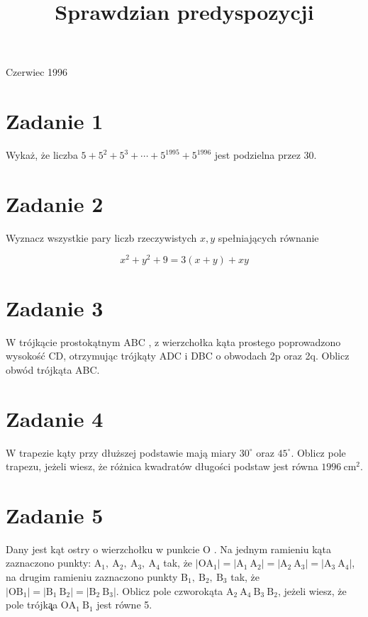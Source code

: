 \documentclass[10pt]{article}
\title{Sprawdzian predyspozycji }
\author{}
\date{}
\begin{document}
\maketitle
Czerwiec 1996

\section*{Zadanie 1}
Wykaż, że liczba \(5+5^{2}+5^{3}+\cdots+5^{1995}+5^{1996}\) jest podzielna przez 30.

\section*{Zadanie 2}
Wyznacz wszystkie pary liczb rzeczywistych \(x, y\) spełniających równanie

\[
x^{2}+y^{2}+9=3(x+y)+x y
\]

\section*{Zadanie 3}
W trójkącie prostokątnym ABC , z wierzchołka kąta prostego poprowadzono wysokość CD, otrzymując trójkąty ADC i DBC o obwodach 2p oraz 2q. Oblicz obwód trójkąta ABC.

\section*{Zadanie 4}
W trapezie kąty przy dłuższej podstawie mają miary \(30^{\circ}\) oraz \(45^{\circ}\). Oblicz pole trapezu, jeżeli wiesz, że różnica kwadratów długości podstaw jest równa \(1996 \mathrm{~cm}^{2}\).

\section*{Zadanie 5}
Dany jest kąt ostry o wierzchołku w punkcie O . Na jednym ramieniu kąta zaznaczono punkty: \(\mathrm{A}_{1}, \mathrm{~A}_{2}, \mathrm{~A}_{3}, \mathrm{~A}_{4}\) tak, że \(\left|\mathrm{OA}_{1}\right|=\left|\mathrm{A}_{1} \mathrm{~A}_{2}\right|=\left|\mathrm{A}_{2} \mathrm{~A}_{3}\right|=\left|\mathrm{A}_{3} \mathrm{~A}_{4}\right|\), na drugim ramieniu zaznaczono punkty \(\mathrm{B}_{1}, \mathrm{~B}_{2}, \mathrm{~B}_{3}\) tak, że \(\left|\mathrm{OB}_{1}\right|=\left|\mathrm{B}_{1} \mathrm{~B}_{2}\right|=\left|\mathrm{B}_{2} \mathrm{~B}_{3}\right|\). Oblicz pole czworokąta \(\mathrm{A}_{2} \mathrm{~A}_{4} \mathrm{~B}_{3} \mathrm{~B}_{2}\), jeżeli wiesz, że pole trójką̨a \(\mathrm{OA}_{1} \mathrm{~B}_{1}\) jest równe 5.
\end{document}
